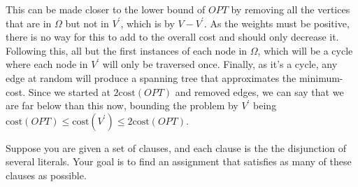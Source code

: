 \documentclass[addpoints]{exam}
\begin{document}
\begin{questions}
\begin{parts}
\begin{solution}
This can be made closer to the lower bound of $OPT$ by removing all the vertices that are in $\Omega$ but not in $V^{\prime}$, which is by $V-V^{\prime}$. As the weights must be positive, there is no way for this to add to the overall cost and should only decrease it. Following this, all but the first instances of each node in $\Omega$, which will be a cycle where each node in $V^{\prime}$ will only be traversed once. Finally, as it's a cycle, any edge at random will produce a spanning tree that approximates the minimum-cost. Since we started at $2\text{cost}(OPT)$ and removed edges, we can say that we are far below than this now, bounding the problem by $V^{\prime}$ being $\text{cost}(OPT)\leq \text{cost}(V^{\prime})\leq 2\text{cost}(OPT)$.

\end{solution}


\end{parts}





Suppose you are given a set of clauses, and each clause is the the disjunction of several literals. Your goal is to find an assignment that satisfies as many of these clauses as possible.

\end{questions}
\end{document}
